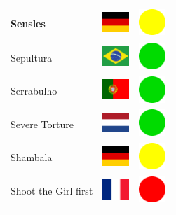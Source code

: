 \documentclass[12pt, a4paper, twoside]{report}
\begin{document}
\begin{center}
\begin{longtable}{|p{5cm}|p{2cm}|p{2cm}|}
Sensles & \includegraphics[width=1cm]{4x3/de} & \includegraphics[width=1cm]{likes/m} \\ \hline
Sepultura & \includegraphics[width=1cm]{4x3/br} & \includegraphics[width=1cm]{likes/y} \\ \hline
Serrabulho & \includegraphics[width=1cm]{4x3/pt} & \includegraphics[width=1cm]{likes/y} \\ \hline
Severe Torture & \includegraphics[width=1cm]{4x3/nl} & \includegraphics[width=1cm]{likes/y} \\ \hline
Shambala & \includegraphics[width=1cm]{4x3/de} & \includegraphics[width=1cm]{likes/m} \\ \hline
Shoot the Girl first & \includegraphics[width=1cm]{4x3/fr} & \includegraphics[width=1cm]{likes/n} \\ \hline

\end{longtable}
\end{center}
\end{document}
